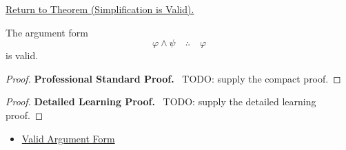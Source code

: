 \newpage
{}
\label{prf:simplification-validity-propositional-logic}

\begin{remark*}[Return]
\hyperref[thm:simplification-validity-propositional-logic]{Return to Theorem (Simplification is Valid).}
\end{remark*}

\begin{theorem*}
The argument form
\[
\varphi\land\psi \quad\therefore\quad \varphi
\]
is valid.
\end{theorem*}

\begin{proof}
\textbf{Professional Standard Proof.}~
TODO: supply the compact proof.
\end{proof}

\begin{proof}
\textbf{Detailed Learning Proof.}~
TODO: supply the detailed learning proof.
\end{proof}

\begin{remark*}
\end{remark*}

\begin{dependencies}
\begin{itemize}
  \item \hyperref[def:valid-argument-form-propositional-logic]{Valid Argument Form}
\end{itemize}
\end{dependencies}

\clearpage
